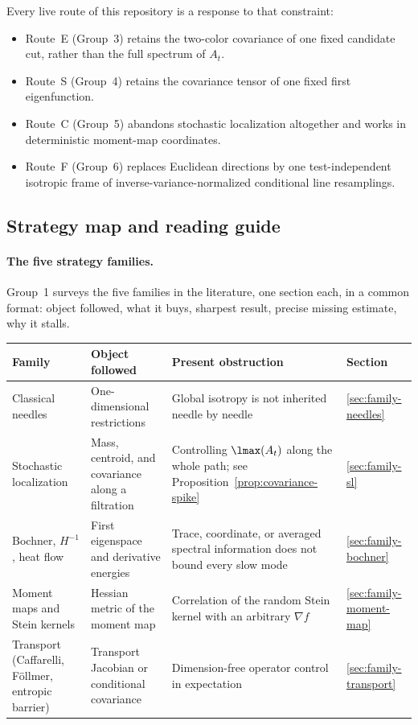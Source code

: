 \documentclass[../../main.tex]{subfiles}
\begin{document}
Every live route of this repository is a response to that constraint:

\begin{itemize}[leftmargin=1.6em]
  \item Route~E (Group~3) retains the two-color covariance of one fixed candidate cut, rather
  than the full spectrum of $A_t$.
  \item Route~S (Group~4) retains the covariance tensor of one fixed first eigenfunction.
  \item Route~C (Group~5) abandons stochastic localization altogether and works in deterministic
  moment-map coordinates.
  \item Route~F (Group~6) replaces Euclidean directions by one test-independent isotropic frame
  of inverse-variance-normalized conditional line resamplings.
\end{itemize}

\subsection{Strategy map and reading guide}
\label{subsec:kls-reading-map}
\label{sec:kls-strategy-map}

\paragraph{The five strategy families.}
Group~1 surveys the five families in the literature, one section each, in a common format:
object followed, what it buys, sharpest result, precise missing estimate, why it stalls.

\begin{center}
\begin{tabularx}{\textwidth}{@{}>{\raggedright\arraybackslash}p{}>{\raggedright\arraybackslash}p{}Y>{\raggedright\arraybackslash}p{0.13\textwidth}@{}}
\toprule
Family & Object followed & Present obstruction & Section \\
\midrule
Classical needles & One-dimensional restrictions & Global isotropy is not inherited needle by
needle & \ref{sec:family-needles} \\
\addlinespace
Stochastic localization & Mass, centroid, and covariance along a filtration & Controlling
$\lmax(A_t)$ along the whole path; see Proposition~\ref{prop:covariance-spike} &
\ref{sec:family-sl} \\
\addlinespace
Bochner, $H^{-1}$, heat flow & First eigenspace and derivative energies & Trace, coordinate, or
averaged spectral information does not bound every slow mode & \ref{sec:family-bochner} \\
\addlinespace
Moment maps and Stein kernels & Hessian metric of the moment map & Correlation of the random
Stein kernel with an arbitrary $\nabla f$ & \ref{sec:family-moment-map} \\
\addlinespace
Transport (Caffarelli, F\"ollmer, entropic barrier) & Transport Jacobian or conditional
covariance & Dimension-free operator control in expectation & \ref{sec:family-transport} \\
\bottomrule
\end{tabularx}
\end{center}
\end{document}
